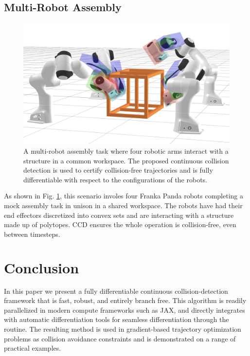 \subsection{Multi-Robot Assembly}
\begin{figure}[t!]
    \centering
    \includegraphics[width=.47\textwidth]{figures/ballet/ballet1.png}
    \caption{A multi-robot assembly task where four robotic arms interact with a structure in a common workspace. The proposed continuous collision detection is used to certify collision-free trajectories and is fully differentiable with respect to the configurations of the robots.}
    \label{fig:ballet}
\end{figure}
As shown in Fig. \ref{fig:ballet}, this scenario involes four Franka Panda robots completing a mock assembly task in unison in a shared workspace. The robots have had their end effectors discretized into convex sets and are interacting with a structure made up of polytopes. CCD ensures the whole operation is collision-free, even between timesteps.
\section{Conclusion}\label{sec:cdcol:conclusion}
%
%
%
%
In this paper we present a fully differentiable continuous collision-detection framework that is fast, robust, and entirely branch free. This algorithm is readily parallelized in modern compute frameworks such as JAX, and directly integrates with automatic differentiation tools for seamless differentiation through the routine. The resulting method is used in gradient-based trajectory optimization problems as collision avoidance constraints and is demonstrated on a range of practical examples.  

